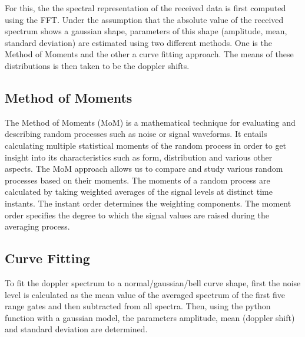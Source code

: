 For this, the the spectral representation of the received data is first computed using the FFT. Under the assumption that the absolute value of the received spectrum shows a gaussian shape, parameters of this shape (amplitude, mean, standard deviation) are estimated using two different methods. One is the Method of Moments and the other a curve fitting approach. The means of these distributions is then taken to be the doppler shifts.


\subsection{Method of Moments}
The Method of Moments (MoM) is a mathematical technique for evaluating and describing random processes such as noise or signal waveforms. It entails calculating multiple statistical moments of the random process in order to get insight into its characteristics such as form, distribution and various other aspects. The MoM approach allows us to compare and study various random processes based on their moments. The moments of a random process are calculated by taking weighted averages of the signal levels at distinct time instants. The instant order determines the weighting components. The moment order specifies the degree to which the signal values are raised during the averaging process.


\subsection{Curve Fitting}
To fit the doppler spectrum to a normal/gaussian/bell curve shape, first the noise level is calculated as the mean value of the averaged spectrum of the first five range gates and then subtracted from all spectra. Then, using the python function  with a gaussian model, the parameters amplitude, mean (doppler shift) and standard deviation are determined.

